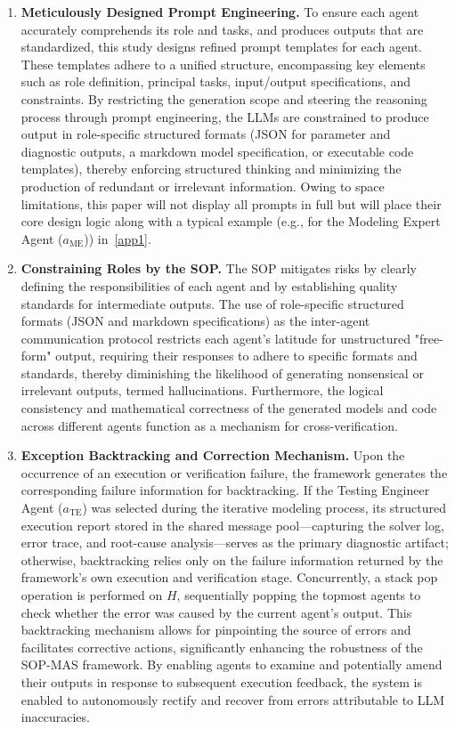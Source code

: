 \documentclass[preprint,12pt]{elsarticle}
\begin{document}
\begin{enumerate}[label=\arabic*)]
 \item \textbf{Meticulously Designed Prompt Engineering.} To ensure each agent accurately comprehends its role and tasks, and produces outputs that are standardized, this study designs refined prompt templates for each agent. These templates adhere to a unified structure, encompassing key elements such as role definition, principal tasks, input/output specifications, and constraints. By restricting the generation scope and steering the reasoning process through prompt engineering, the LLMs are constrained to produce output in role-specific structured formats (JSON for parameter and diagnostic outputs, a markdown model specification, or executable code templates), thereby enforcing structured thinking and minimizing the production of redundant or irrelevant information. Owing to space limitations, this paper will not display all prompts in full but will place their core design logic along with a typical example (e.g., for the Modeling Expert Agent ($a_{\text{ME}}$)) in~\ref{app1}.
 \item \textbf{Constraining Roles by the SOP.} The SOP mitigates risks by clearly defining the responsibilities of each agent and by establishing quality standards for intermediate outputs. The use of role-specific structured formats (JSON and markdown specifications) as the inter-agent communication protocol restricts each agent's latitude for unstructured "free-form" output, requiring their responses to adhere to specific formats and standards, thereby diminishing the likelihood of generating nonsensical or irrelevant outputs, termed hallucinations. Furthermore, the logical consistency and mathematical correctness of the generated models and code across different agents function as a mechanism for cross-verification.
 \item \textbf{Exception Backtracking and Correction Mechanism.} Upon the occurrence of an execution or verification failure, the framework generates the corresponding failure information for backtracking. If the Testing Engineer Agent ($a_{\text{TE}}$) was selected during the iterative modeling process, its structured execution report stored in the shared message pool—capturing the solver log, error trace, and root-cause analysis—serves as the primary diagnostic artifact; otherwise, backtracking relies only on the failure information returned by the framework's own execution and verification stage. Concurrently, a stack pop operation is performed on $H$, sequentially popping the topmost agents to check whether the error was caused by the current agent's output. This backtracking mechanism allows for pinpointing the source of errors and facilitates corrective actions, significantly enhancing the robustness of the SOP-MAS framework. By enabling agents to examine and potentially amend their outputs in response to subsequent execution feedback, the system is enabled to autonomously rectify and recover from errors attributable to LLM inaccuracies.
\end{enumerate}
\end{document}
